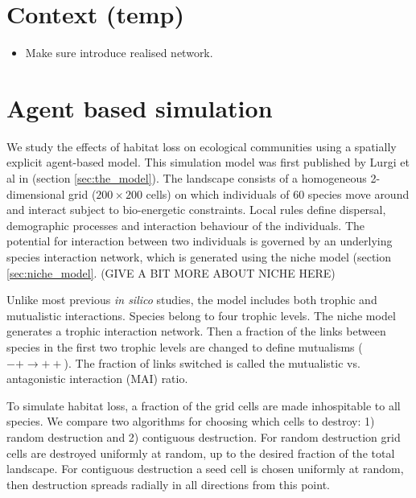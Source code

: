 
\section{Context (temp)}

\begin{itemize}
	\item Make sure introduce realised network.
\end{itemize}



\section{Agent based simulation}
\label{sec:method}


We study the effects of habitat loss on ecological communities using a spatially explicit agent-based model. This simulation model was first published by Lurgi et al in \cite{lurgi2015effects} (section \ref{sec:the_model}). The landscape consists of a homogeneous 2-dimensional grid ($200 \times 200$ cells) on which individuals of $60$ species move around and interact subject to bio-energetic constraints. Local rules define dispersal, demographic processes and interaction behaviour of the individuals. The potential for interaction between two individuals is governed by an underlying species interaction network, which is generated using the niche model \cite{williams2000simple} (section \ref{sec:niche_model}.  (GIVE A BIT MORE ABOUT NICHE HERE)   

Unlike most previous \emph{in silico} studies, the model includes both trophic and mutualistic interactions. Species belong to four trophic levels. The niche model generates a trophic interaction network. Then a fraction of the links between species in the first two trophic levels are changed to define mutualisms ($-+ \rightarrow ++$). The fraction of links switched is called the mutualistic vs. antagonistic interaction (MAI) ratio.  

To simulate habitat loss, a fraction of the grid cells are made inhospitable to all species. We compare two algorithms for choosing which cells to destroy: 1) random destruction and 2) contiguous destruction. For random destruction grid cells are destroyed uniformly at random, up to the desired fraction of the total landscape. For contiguous destruction a seed cell is chosen uniformly at random, then destruction spreads radially in all directions from this point.  

